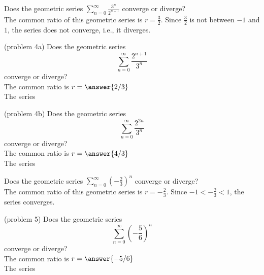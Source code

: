 \documentclass[handout]{ximera}
\begin{document}
 
 
 
\begin{example}[example 4]
Does the geometric series $\displaystyle{\sum_{n=0}^\infty \frac{3^n}{2^{n+1}}}$ converge or diverge?\\
The common ratio of this geometric series is $r = \frac32$. Since $\frac32$ is not between $-1$ and $1$,
the series does not converge, i.e., it diverges.
\end{example}

\begin{problem}(problem 4a)
 Does the geometric series
 \[
 \sum_{n=0}^\infty \frac{2^{n+1}}{3^n} 
 \]
 converge or diverge?\\
 The common ratio is $r = \answer{2/3}$\\
 The series
 \begin{multipleChoice}
 \end{multipleChoice}
 \end{problem}
 
 
 \begin{problem}(problem 4b)
 Does the geometric series
 \[
 \sum_{n=0}^\infty \frac{2^{2n}}{3^n} 
 \]
 converge or diverge?\\
 The common ratio is $r = \answer{4/3}$\\
 The series
 \begin{multipleChoice}
 \end{multipleChoice}
 \end{problem}
 

\begin{example}[example 5]
Does the geometric series $\displaystyle{\sum_{n=0}^\infty \left(-\frac23\right)^n }$ converge or diverge?\\
The common ratio of this geometric series is $r = -\frac23$. Since $-1 < -\frac23 < 1$,
the series converges.
\end{example}

\begin{problem}(problem 5)
 Does the geometric series
 \[
 \sum_{n=0}^\infty \left(-\frac56 \right)^n
 \]
 converge or diverge?\\
 The common ratio is $r = \answer{-5/6}$\\
 The series
 \begin{multipleChoice}
 \end{multipleChoice}
 \end{problem}
\end{document}
